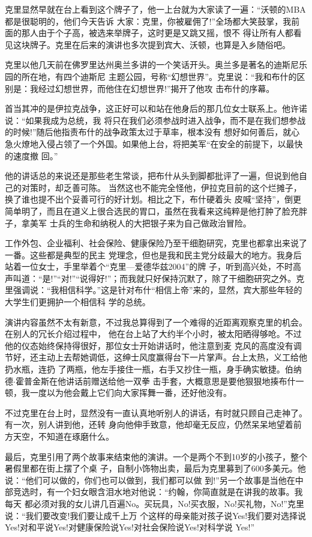 ﻿\documentclass[11pt]{article}
\begin{document}
克里显然早就在台上看到这个牌子了，他一上台就为大家读了一遍：``沃顿的MBA都是很聪明的，他们今天告诉
大家：克里，你被雇佣了!''全场都大笑鼓掌，我前面的那人由于个子高，被选来举牌子，这时更是又跳又摇，恨不
得让所有人都看见这块牌子。克里在后来的演讲也多次提到宾大、沃顿，也算是入乡随俗吧。

克里以他几天前在佛罗里达州奥兰多讲的一个笑话开头。奥兰多是著名的迪斯尼乐园的所在地，有四个迪斯尼
主题公园，号称``幻想世界''。克里说：``我和布什的区别是：我经过幻想世界，而他住在幻想世界!''揭开了他攻
击布什的序幕。

首当其冲的是伊拉克战争，这正好可以和站在他身后的那几位女士联系上。他许诺说：``如果我成为总统，我
将只在我们必须参战时进入战争，而不是在我们想参战的时候!''随后他指责布什的战争政策太过于草率，根本没有
想好如何善后，就心急火燎地入侵占领了一个外国。如果他上台，将把美军``在安全的前提下，以最快的速度撤
回。''

他的讲话总的来说还是那些老生常谈，把布什从头到脚都批评了一遍，但说到他自己的对策时，却乏善可陈。
当然这也不能完全怪他，伊拉克目前的这个烂摊子，换了谁也提不出个妥善可行的好计划。相比之下，布什硬着头
皮喊``坚持''，倒更简单明了，而且在道义上很合选民的胃口，虽然在我看来这纯粹是他打肿了脸充胖子，拿美军
士兵的生命和纳税人的大把银子来为自己做政治冒险。


工作外包、企业福利、社会保险、健康保险乃至干细胞研究，克里也都拿出来说了一番。这些都是典型的民主
党理念，但也是我和民主党分歧最大的地方。我身后站着一位女士，手里举着个``克里---爱德华兹2004''的牌
子，听到高兴处，不时高声叫道：``是!''``对!''``说得好!''；而我就只好保持沉默了，除了干细胞研究之外。克
里强调说：``我相信科学。''这是针对布什``相信上帝''来的，显然，宾大那些年轻的大学生们更拥护一个相信科
学的总统。

演讲内容虽然不太有新意，不过我总算得到了一个难得的近距离观察克里的机会。在别人的冗长介绍过程中，
他在台上站了大约半个小时，被太阳晒得够呛。不过他的仪态始终保持得很好，那位女士开始讲话时，他注意到麦
克风的高度没有调节好，还主动上去帮她调低，这绅士风度赢得台下一片掌声。台上太热，义工给他扔水瓶，连扔
了两瓶，他左手接住一瓶，右手又抄住一瓶，身手确实敏捷。伯纳德$\cdot$霍普金斯在他讲话前赠送给他一双拳
击手套，大概意思是要他狠狠地揍布什一顿，我一度以为他会戴上它们向大家挥舞一番，还好他没有。

不过克里在台上时，显然没有一直认真地听别人的讲话，有时就只顾自己走神了。有一次，别人讲到他，还转
身向他伸手致意，他却毫无反应，仍然呆呆地望着前方天空，不知道在琢磨什么。

最后，克里引用了两个故事来结束他的演讲。一个是两个不到10岁的小孩子，整个暑假里都在街上摆了个桌
子，自制小饰物出卖，最后为克里募到了600多美元。他说：``他们可以做的，你们也可以做到，我们都可以做
到!''另一个故事是当他在中部竞选时，有一个妇女眼含泪水地对他说：``约翰，你简直就是在讲我的故事。我每天
都必须对我的女儿讲几百遍No。买玩具，No!买衣服，No!买礼物，No!''克里说：``我们要改变!我们要让成千上万
个这样的母亲能对孩子说Yes!我们要对选择说Yes!对和平说Yes!对健康保险说Yes!对社会保险说Yes!对科学说
Yes!''
\end{document}
